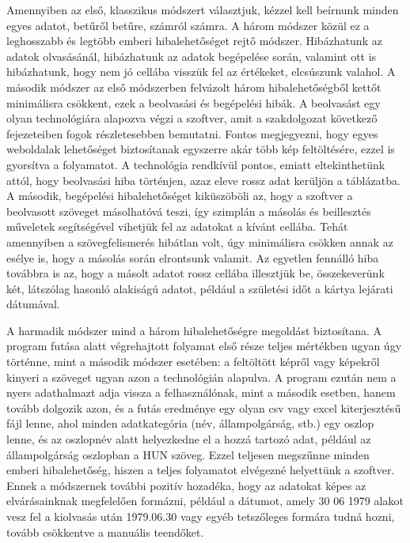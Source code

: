 \documentclass[12pt]{report}
\begin{document}
Amennyiben az első, klasszikus módszert választjuk, kézzel kell beírnunk minden egyes adatot, betűről betűre, számról számra. A három módszer közül ez a leghosszabb és legtöbb emberi hibalehetőséget rejtő módszer. Hibázhatunk az adatok olvasásánál, hibázhatunk az adatok begépelése során, valamint ott is hibázhatunk, hogy nem jó cellába visszük fel az értékeket, elcsúszunk valahol.
\newpage
A második módszer az első módszerben felvázolt három hibalehetőségből kettőt minimálisra csökkent, ezek a beolvasási és begépelési hibák. A beolvasást egy olyan technológiára alapozva végzi a szoftver, amit a szakdolgozat következő fejezeteiben fogok részletesebben bemutatni. Fontos megjegyezni, hogy egyes weboldalak lehetőséget biztosítanak egyszerre akár több kép feltöltésére, ezzel is gyorsítva a folyamatot. A technológia rendkívül pontos, emiatt eltekinthetünk attól, hogy beolvasási hiba történjen, azaz eleve rossz adat kerüljön a táblázatba. A második, begépelési hibalehetőséget kiküszöböli az, hogy a szoftver a beolvasott szöveget másolhatóvá teszi, így szimplán a másolás és beillesztés műveletek segítségével vihetjük fel az adatokat a kívánt cellába. Tehát amennyiben a szövegfelismerés hibátlan volt, úgy minimálisra csökken annak az esélye is, hogy a másolás során elrontsunk valamit. Az egyetlen fennálló hiba továbbra is az, hogy a másolt adatot rossz cellába illesztjük be, összekeverünk két, látszólag hasonló alakiságú adatot, például a születési időt a kártya lejárati dátumával.

A harmadik módszer mind a három hibalehetőségre megoldást biztosítana. A program futása alatt végrehajtott folyamat első része teljes mértékben ugyan úgy történne, mint a második módszer esetében: a feltöltött képről vagy képekről kinyeri a szöveget ugyan azon a technológián alapulva. A program ezután nem a nyers adathalmazt adja vissza a felhasználónak, mint a második esetben, hanem tovább dolgozik azon, és a futás eredménye egy olyan csv vagy excel kiterjesztésű fájl lenne, ahol minden adatkategória (név, állampolgárság, stb.) egy oszlop lenne, és az oszlopnév alatt helyezkedne el a hozzá tartozó adat, például az állampolgárság oszlopban a HUN szöveg. Ezzel teljesen megszűnne minden emberi hibalehetőség, hiszen a teljes folyamatot elvégezné helyettünk a szoftver. Ennek a módszernek további pozitív hozadéka, hogy az adatokat képes az elvárásainknak megfelelően formázni, például a dátumot, amely 30 06 1979 alakot vesz fel a kiolvasás után 1979.06.30 vagy egyéb tetszőleges formára tudná hozni, tovább csökkentve a manuális teendőket.
\end{document}
